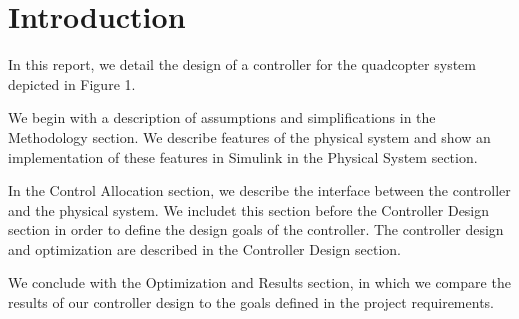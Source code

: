 \section*{Introduction}
In this report, we detail the design of a controller for the quadcopter system depicted in Figure 1. %

We begin with a description of assumptions and simplifications in the Methodology section. We describe features of the physical system and show an implementation of these features in Simulink in the Physical System section.

In the Control Allocation section, we describe the interface between the controller and the physical system. We includet this section before the Controller Design section in order to define the design goals of the controller. The controller design and optimization are described in the Controller Design section.

We conclude with the Optimization and Results section, in which we compare the results of our controller design to the goals defined in the project requirements.